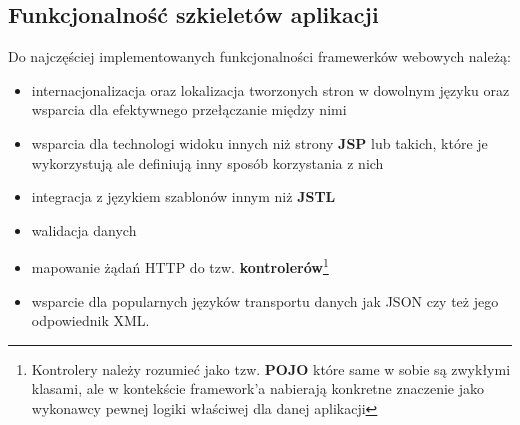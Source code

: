 	\subsection{Funkcjonalność szkieletów aplikacji}
	
	Do najczęściej implementowanych funkcjonalności framewerków webowych należą:
	\begin{itemize}
		\item internacjonalizacja oraz lokalizacja tworzonych stron w dowolnym języku oraz wsparcia dla efektywnego przełączanie między nimi
		\item wsparcia dla technologi widoku innych niż strony \textbf{JSP} lub takich, które je wykorzystują ale definiują inny sposób korzystania z nich
		\item integracja z językiem szablonów innym niż \textbf{JSTL}
		\item walidacja danych
		\item mapowanie żądań HTTP do tzw. \textbf{kontrolerów}\footnote{Kontrolery należy rozumieć jako tzw. \textbf{POJO} które same w sobie są zwykłymi klasami, ale w kontekście framework'a nabierają konkretne znaczenie jako wykonawcy pewnej logiki właściwej dla danej aplikacji}
		\item wsparcie dla popularnych języków transportu danych jak JSON czy też jego odpowiednik XML. 
	\end{itemize}
	

